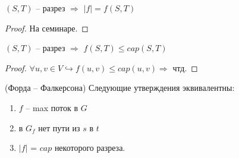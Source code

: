 \begin{lemma}
	$(S, T)$ -- разрез $\Rightarrow$ $\lvert f \rvert = f(S, T)$
\end{lemma}

\begin{proof}
	На семинаре.	
\end{proof}

\begin{lemma}
	$(S, T)$ -- разрез $\Rightarrow$ $f(S, T) \leq cap(S, T)$
\end{lemma}

\begin{proof}
	$\forall u, v \in V \hookrightarrow f(u, v) \leq cap(u, v) \Rightarrow$ чтд.
\end{proof}

\begin{theorem} (Форда -- Фалкерсона)
	Следующие утверждения эквивалентны:
	\begin{enumerate}
		\item $f$ -- max поток в $G$  
		\item в $G_f$ нет пути из  $s$ в  $t$
		\item $\lvert f \rvert$  = $cap$ некоторого разреза.
	\end{enumerate}
\end{theorem}

